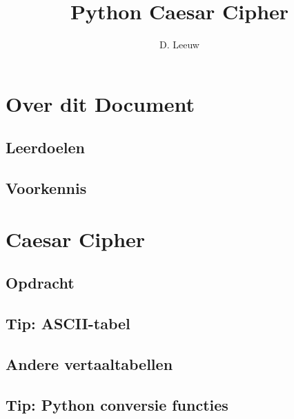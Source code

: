 \documentclass[a4paper,12pt,twoside,openright,titlepage]{article}
\author{D. Leeuw}
\title{Python Caesar Cipher}
\date{\today\\
1.0.0 \\
\vfill
\raggedright
\copyright\ 2025-2026 Dennis Leeuw\\
}
\begin{document}

\maketitle


\section{Over dit Document}
\subsection{Leerdoelen}

\subsection{Voorkennis}




\section{Caesar Cipher}


\subsection{Opdracht}


\subsection{Tip: ASCII-tabel}




 \subsection{Andere vertaaltabellen}
 

\subsection{Tip: Python conversie functies}



\printindex
\end{document}
